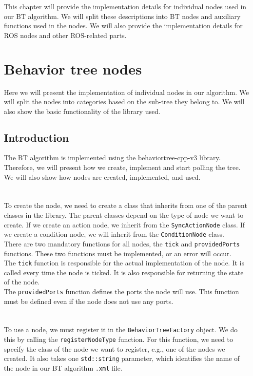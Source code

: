 This chapter will provide the implementation details for individual nodes used in our BT algorithm. We will split these descriptions into BT nodes and auxiliary functions used in the nodes. We will also provide the implementation details for ROS nodes and other ROS-related parts.

\section{Behavior tree nodes}
    Here we will present the implementation of individual nodes in our algorithm. We will split the nodes into categories based on the sub-tree they belong to. We will also show the basic functionality of the library used.
    \subsection{Introduction}
        The BT algorithm is implemented using the behaviortree-cpp-v3 library. Therefore, we will present how we create, implement and start polling the tree. We will also show how nodes are created, implemented, and used.\\\\
        \\
            To create the node, we need to create a class that inherits from one of the parent classes in the library. The parent classes depend on the type of node we want to create. If we create an action node, we inherit from the \texttt{SyncActionNode} class. If we create a condition node, we will inherit from the \texttt{ConditionNode} class.\\
            There are two mandatory functions for all nodes, the \texttt{tick} and \texttt{providedPorts} functions. These two functions must be implemented, or an error will occur.\\
            The \texttt{tick} function is responsible for the actual implementation of the node. It is called every time the node is ticked. It is also responsible for returning the state of the node.\\
            The \texttt{providedPorts} function defines the ports the node will use. This function must be defined even if the node does not use any ports.\\\\
        \\
            To use a node, we must register it in the \texttt{BehaviorTreeFactory} object. We do this by calling the \texttt{registerNodeType} function. For this function, we need to specify the class of the node we want to register, e.g., one of the nodes we created. It also takes one \texttt{std::string} parameter, which identifies the name of the node in our BT algorithm \texttt{.xml} file.\\\\

